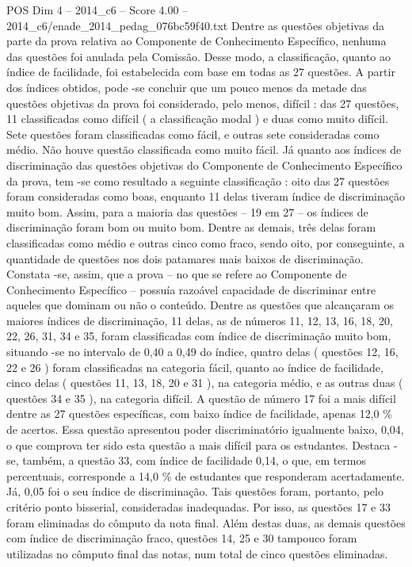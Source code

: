 \begin{textsample}{POS Dim 4 – 2014\_c6 – Score 4.00 – 2014\_c6/enade\_2014\_pedag\_076bc59f40.txt}
Dentre as questões objetivas da parte da prova relativa ao Componente de Conhecimento Específico, nenhuma das questões foi anulada pela Comissão.
Desse modo, a classificação, quanto ao índice de facilidade, foi estabelecida com base em todas as 27 questões.
A partir dos índices obtidos, pode -se concluir que um pouco menos da metade das questões objetivas da prova foi considerado, pelo menos, difícil : das 27 questões, 11 classificadas como difícil ( a classificação modal ) e duas como muito difícil.
Sete questões foram classificadas como fácil, e outras sete consideradas como médio.
Não houve questão classificada como muito fácil.
Já quanto aos índices de discriminação das questões objetivas do Componente de Conhecimento Específico da prova, tem -se como resultado a seguinte classificação : oito das 27 questões foram consideradas como boas, enquanto 11 delas tiveram índice de discriminação muito bom.
Assim, para a maioria das questões – 19 em 27 – os índices de discriminação foram bom ou muito bom.
Dentre as demais, três delas foram classificadas como médio e outras cinco como fraco, sendo oito, por conseguinte, a quantidade de questões nos dois patamares mais baixos de discriminação.
Constata -se, assim, que a prova – no que se refere ao Componente de Conhecimento Específico – possuía razoável capacidade de discriminar entre aqueles que dominam ou não o conteúdo.
Dentre as questões que alcançaram os maiores índices de discriminação, 11 delas, as de números 11, 12, 13, 16, 18, 20, 22, 26, 31, 34 e 35, foram classificadas com índice de discriminação muito bom, situando -se no intervalo de 0,40 a 0,49 do índice, quatro delas ( questões 12, 16, 22 e 26 ) foram classificadas na categoria fácil, quanto ao índice de facilidade, cinco delas ( questões 11, 13, 18, 20 e 31 ), na categoria médio, e as outras duas ( questões 34 e 35 ), na categoria difícil.
A questão de número 17 foi a mais difícil dentre as 27 questões específicas, com baixo índice de facilidade, apenas 12,0 \% de acertos.
Essa questão apresentou poder discriminatório igualmente baixo, 0,04, o que comprova ter sido esta questão a mais difícil para os estudantes.
Destaca -se, também, a questão 33, com índice de facilidade 0,14, o que, em termos percentuais, corresponde a 14,0 \% de estudantes que responderam acertadamente.
Já, 0,05 foi o seu índice de discriminação.
Tais questões foram, portanto, pelo critério ponto bisserial, consideradas inadequadas.
Por isso, as questões 17 e 33 foram eliminadas do cômputo da nota final.
Além destas duas, as demais questões com índice de discriminação fraco, questões 14, 25 e 30 tampouco foram utilizadas no cômputo final das notas, num total de cinco questões eliminadas.

\end{textsample}
